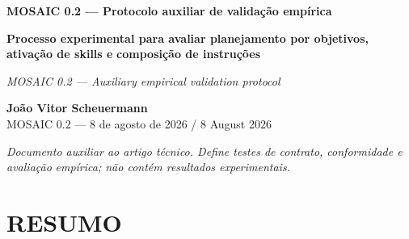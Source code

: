 \documentclass[12pt,a4paper]{article}
\begin{document}
\begin{center}\textbf{MOSAIC 0.2 — Protocolo auxiliar de validação empírica}\par\end{center}

\textbf{Processo experimental para avaliar planejamento por objetivos, ativação de skills e} \textbf{composição de instruções}


\textit{MOSAIC 0.2 — Auxiliary empirical validation protocol}


\begin{center}\textbf{João Vitor Scheuermann}\\MOSAIC 0.2 — 8 de agosto de 2026 / 8 August 2026\end{center}

\textit{Documento auxiliar ao artigo técnico. Define testes de contrato, conformidade e avaliação} \textit{empírica; não contém resultados experimentais.}


\section*{RESUMO}
\end{document}
